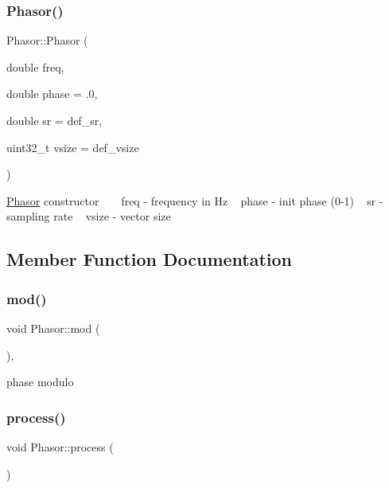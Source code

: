 \subsubsection{\texorpdfstring{Phasor()}{Phasor()}}
{\footnotesize\ttfamily Phasor\+::\+Phasor (\begin{DoxyParamCaption}\item[{double}]{freq,  }\item[{double}]{phase = {\ttfamily .0},  }\item[{double}]{sr = {\ttfamily def\+\_\+sr},  }\item[{uint32\+\_\+t}]{vsize = {\ttfamily def\+\_\+vsize} }\end{DoxyParamCaption})}

\hyperlink{class_phasor}{Phasor} constructor ~\newline
~\newline
freq -\/ frequency in Hz ~\newline
phase -\/ init phase (0-\/1) ~\newline
 sr -\/ sampling rate ~\newline
vsize -\/ vector size ~\newline


\subsection{Member Function Documentation}
\mbox{\label{class_phasor_a2a8267de2401d912bdd8fc25f2a38eb9}} 
\subsubsection{\texorpdfstring{mod()}{mod()}}
{\footnotesize\ttfamily void Phasor\+::mod (\begin{DoxyParamCaption}{ }\end{DoxyParamCaption})\hspace{0.3cm}{\ttfamily [inline]}, {\ttfamily [protected]}}

phase modulo \mbox{\label{class_phasor_abb4f4c04b5ca206ea79b8f9437bb1c33}} 
\subsubsection{\texorpdfstring{process()}{process()}\hspace{0.1cm}{\footnotesize\ttfamily [1/2]}}
{\footnotesize\ttfamily void Phasor\+::process (\begin{DoxyParamCaption}{ }\end{DoxyParamCaption})\hspace{0.3cm}{\ttfamily [virtual]}}

